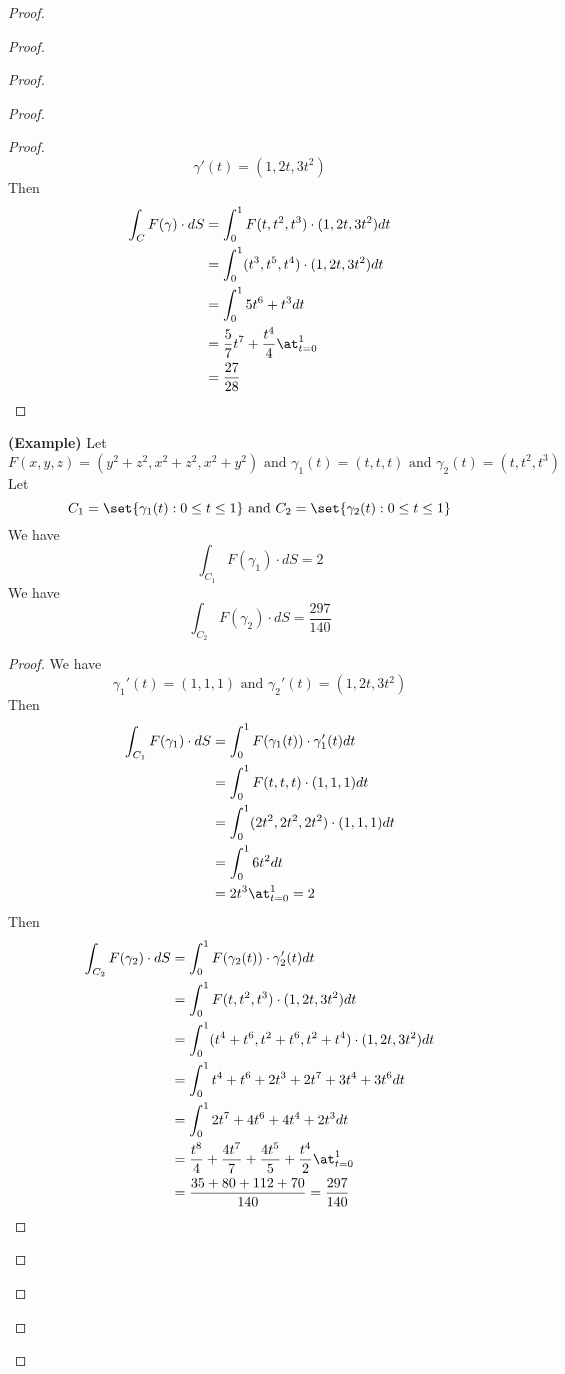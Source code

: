 \documentclass{report}
\begin{document}
\begin{proof}
\begin{proof}
\begin{proof}
\begin{proof}
\begin{proof}
\begin{equation}
\gamma '(t)=(1,2t,3t^2)
\end{equation}
Then
\begin{align}
\int_{C} F(\gamma )\cdot dS&= \int_0^1 F(t,t^2,t^3)\cdot (1,2t,3t^2) dt\\
&=\int_0^1 (t^3,t^5,t^4)\cdot (1,2t,3t^2)dt\\
&=\int_0^1 5t^6+t^3 dt\\
&=\frac{5}{7}t^7+\frac{t^4}{4}\at_{t=0}^1\\
&=\frac{27}{28}
\end{align}
\end{proof}
\begin{theorem}
\label{9.1.11}
\textbf{(Example)} Let
\begin{equation}
F(x,y,z)=(y^2+z^2,x^2+z^2,x^2+y^2)\text{ and }\gamma_1 (t)=(t,t,t)\text{ and }\gamma _2 (t)=(t,t^2,t^3)
\end{equation}
Let
\begin{equation}
C_1=\set{\gamma _1(t):0\leq t\leq 1}\text{ and }C_2=\set{\gamma _2(t):0\leq t\leq 1}
\end{equation}
We have
\begin{equation}
\int_{C_1}F(\gamma_1 )\cdot dS=2
\end{equation}
We have
\begin{equation}
\int_{C_2}F(\gamma _2)\cdot dS=\frac{297}{140}
\end{equation}
\end{theorem}
\begin{proof}
We have
\begin{equation}
\gamma _1'(t)=(1,1,1)\text{ and }\gamma _2'(t)=(1,2t,3t^2)
\end{equation}
Then
\begin{align}
\int_{C_1}F(\gamma _1)\cdot dS&=\int_0^1 F(\gamma _1(t))\cdot \gamma _1'(t)dt\\
&=\int_0^1 F(t,t,t)\cdot (1,1,1)dt\\
&=\int_0^1 (2t^2,2t^2,2t^2)\cdot (1,1,1)dt\\
&=\int_0^1 6t^2 dt\\
&=2t^3\at_{t=0}^1=2
\end{align}
Then 
\begin{align}
\int_{C_2}F(\gamma _2)\cdot dS&=\int_0^1 F(\gamma _2(t))\cdot \gamma _2'(t)dt\\
&=\int_0^1 F(t,t^2,t^3)\cdot (1,2t,3t^2)dt\\
&=\int_0^1 (t^4+t^6,t^2+t^6,t^2+t^4)\cdot (1,2t,3t^2)dt\\
&=\int_0^1 t^4+t^6+2t^3+2t^7+3t^4+3t^6dt\\
&=\int_0^1 2t^7+4t^6+4t^4 +2t^3dt\\
&=\frac{t^8}{4}+\frac{4t^7}{7}+\frac{4t^5}{5}+\frac{t^4}{2}\at_{t=0}^1\\
&=\frac{35+80+112+70}{140}=\frac{297}{140}
\end{align}
\end{proof}

\end{proof}
\end{proof}
\end{proof}
\end{proof}
\end{document}

